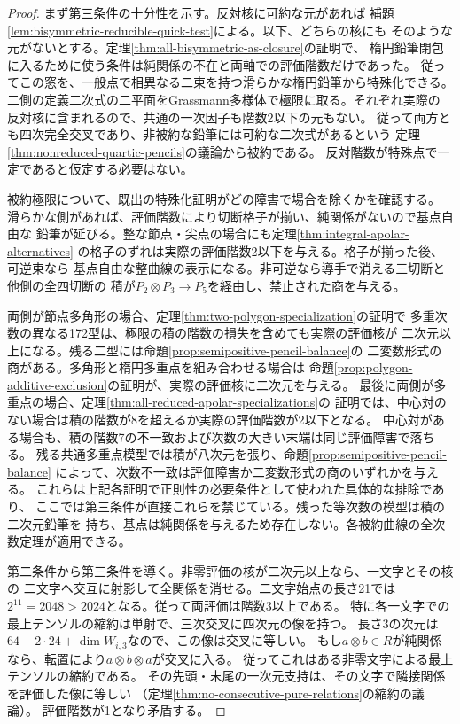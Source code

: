 \begin{proof}
まず第三条件の十分性を示す。反対核に可約な元があれば
補題\ref{lem:bisymmetric-reducible-quick-test}による。以下、どちらの核にも
そのような元がないとする。定理\ref{thm:all-bisymmetric-as-closure}の証明で、
楕円鉛筆閉包に入るために使う条件は純関係の不在と両軸での評価階数だけであった。
従ってこの窓を、一般点で相異なる二束を持つ滑らかな楕円鉛筆から特殊化できる。
二側の定義二次式の二平面をGrassmann多様体で極限に取る。それぞれ実際の
反対核に含まれるので、共通の一次因子も階数2以下の元もない。
従って両方とも四次完全交叉であり、非被約な鉛筆には可約な二次式があるという
定理\ref{thm:nonreduced-quartic-pencils}の議論から被約である。
反対階数が特殊点で一定であると仮定する必要はない。

被約極限について、既出の特殊化証明がどの障害で場合を除くかを確認する。
滑らかな側があれば、評価階数により切断格子が揃い、純関係がないので基点自由な
鉛筆が延びる。整な節点・尖点の場合にも定理\ref{thm:integral-apolar-alternatives}
の格子のずれは実際の評価階数2以下を与える。格子が揃った後、可逆束なら
基点自由な整曲線の表示になる。非可逆なら導手で消える三切断と他側の全四切断の
積が$P_2\otimes P_3\to P_5$を経由し、禁止された商を与える。

両側が節点多角形の場合、定理\ref{thm:two-polygon-specialization}の証明で
多重次数の異なる172型は、極限の積の階数の損失を含めても実際の評価核が
二次元以上になる。残る二型には命題\ref{prop:semipositive-pencil-balance}の
二変数形式の商がある。多角形と楕円多重点を組み合わせる場合は
命題\ref{prop:polygon-additive-exclusion}の証明が、実際の評価核に二次元を与える。
最後に両側が多重点の場合、定理\ref{thm:all-reduced-apolar-specializations}の
証明では、中心対のない場合は積の階数が8を超えるか実際の評価階数が2以下となる。
中心対がある場合も、積の階数7の不一致および次数の大きい末端は同じ評価障害で落ちる。
残る共通多重点模型では積が八次元を張り、命題\ref{prop:semipositive-pencil-balance}
によって、次数不一致は評価障害か二変数形式の商のいずれかを与える。
これらは上記各証明で正則性の必要条件として使われた具体的な排除であり、
ここでは第三条件が直接これらを禁じている。残った等次数の模型は積の二次元鉛筆を
持ち、基点は純関係を与えるため存在しない。各被約曲線の全次数定理が適用できる。

第二条件から第三条件を導く。非零評価の核が二次元以上なら、一文字とその核の
二文字へ交互に射影して全関係を消せる。二文字始点の長さ21では
$2^{11}=2048>2024$となる。従って両評価は階数3以上である。
特に各一文字での最上テンソルの縮約は単射で、三次交叉に四次元の像を持つ。
長さ3の次元は$64-2\cdot24+\dim W_{i,3}$なので、この像は交叉に等しい。
もし$a\otimes b\in R$が純関係なら、転置により$a\otimes b\otimes a$が交叉に入る。
従ってこれはある非零文字による最上テンソルの縮約である。
その先頭・末尾の一次元支持は、その文字で隣接関係を評価した像に等しい
（定理\ref{thm:no-consecutive-pure-relations}の縮約の議論）。
評価階数が1となり矛盾する。


\end{proof}
